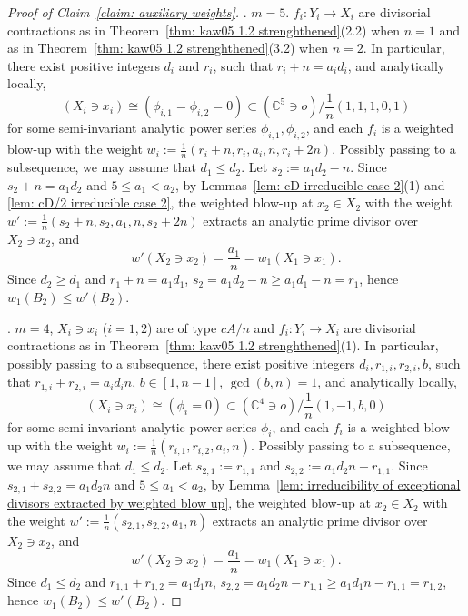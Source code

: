 \documentclass[11pt]{amsart}
\numberwithin{equation}{section}
\theoremstyle{definition}
\theoremstyle{definition}
\begin{document}
\begin{proof}[Proof of Claim~\ref{claim: auxiliary weights}]
. $m=5$. $f_i: Y_i\to X_i$ are divisorial contractions as in Theorem~\ref{thm: kaw05 1.2 strenghthened}(2.2) when $n=1$ and as in Theorem~\ref{thm: kaw05 1.2 strenghthened}(3.2) when $n=2$. In particular, there exist positive integers $d_i$ and $r_i$, such that $r_i+n=a_id_i$, and analytically locally, $$(X_i\ni x_i)\cong (\phi_{i,1}=\phi_{i,2}=0)\subset (\mathbb C^5\ni o)/\frac{1}{n}(1,1,1,0,1)$$ for some semi-invariant analytic power series $\phi_{i,1},\phi_{i,2}$, and each $f_i$ is a weighted blow-up with the weight $w_i:=\frac{1}{n}(r_i+n,r_i,a_i,n,r_i+2n)$. Possibly passing to a subsequence, we may assume that $d_1\leq d_2$. Let $s_2:=a_1d_2-n$. Since $s_2+n=a_1d_2$ and $5\leq a_1< a_2$, by Lemmas~\ref{lem: cD irreducible case 2}(1) and \ref{lem: cD/2 irreducible case 2}, the weighted blow-up at $x_2\in X_2$ with the weight $ w':=\frac{1}{n}(s_2+n,s_2,a_1,n,s_2+2n)$ extracts an analytic prime divisor over $X_2\ni x_2$, and
$$w'(X_2\ni x_2)=\frac{a_1}{n}=w_1(X_1\ni x_1).$$ Since $d_2\geq d_1$ and $r_1+n=a_1d_1$, $s_2=a_1d_2-n\geq a_1d_1-n= r_1$, hence $w_1(B_2)\leq w'(B_2)$.

\medskip

. $m=4$, $X_i\ni x_i$ ($i=1,2$) are of type $cA/n$ and $f_i: Y_i\to X_i$ are divisorial contractions as in Theorem~\ref{thm: kaw05 1.2 strenghthened}(1). In particular, possibly passing to a subsequence, there exist positive integers $d_i,r_{1,i},r_{2,i},b$, such that $r_{1,i}+r_{2,i}=a_id_in$, $b\in [1,n-1]$, $\gcd(b,n)=1$, and analytically locally, $$(X_i\ni x_i)\cong (\phi_i=0)\subset (\mathbb C^4\ni o)/\frac{1}{n}(1,-1,b,0)$$for some semi-invariant analytic power series $\phi_i$, and each $f_i$ is a weighted blow-up with the weight $w_i:=\frac{1}{n}(r_{i,1},r_{i,2},a_i,n)$. Possibly passing to a subsequence, we may assume that $d_1\leq d_2$. Let $s_{2,1}:=r_{1,1}$ and $s_{2,2}:=a_1d_2n-r_{1,1}$. Since $s_{2,1}+s_{2,2}=a_1d_2n$ and $5\leq a_1<a_2$, by Lemma~\ref{lem: irreducibility of exceptional divisors extracted by weighted blow up}, the weighted blow-up at $x_2\in X_2$ with the weight $ w':=\frac{1}{n}(s_{2,1},s_{2,2},a_1,n)$ extracts an analytic prime divisor over $X_2\ni x_2$, and $$ w'(X_2\ni x_2)=\frac{a_1}{n}=w_1(X_1\ni x_1).$$ Since $d_1\leq d_2$ and $r_{1,1}+r_{1,2}=a_1d_1n$, $s_{2,2}=a_1d_2n-r_{1,1}\geq a_1d_1n-r_{1,1}=r_{1,2}$, hence $w_1(B_2)\leq w'(B_2)$.
\end{proof}
\end{document}
